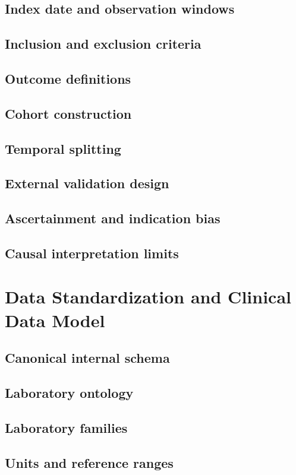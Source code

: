 \documentclass[11pt,journal,onecolumn,draftclsnofoot]{IEEEtran}
\begin{document}
\subsection{Index date and observation windows}
\subsection{Inclusion and exclusion criteria}
\subsection{Outcome definitions}
\subsection{Cohort construction}
\subsection{Temporal splitting}
\subsection{External validation design}
\subsection{Ascertainment and indication bias}
\subsection{Causal interpretation limits}

\section{Data Standardization and Clinical Data Model}
\subsection{Canonical internal schema}
\subsection{Laboratory ontology}
\subsection{Laboratory families}
\subsection{Units and reference ranges}
\end{document}
